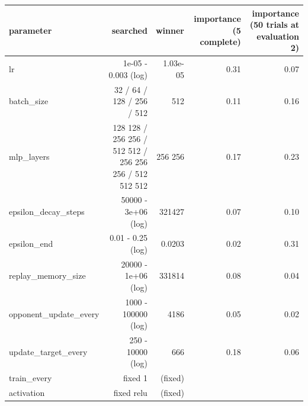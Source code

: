 \begin{tabular}{lrrrr}
\toprule
parameter & searched & winner & importance (5 complete) & importance (50 trials at evaluation 2) \\
\midrule
lr & 1e-05 - 0.003 (log) & 1.03e-05 & 0.31 & 0.07 \\
batch\_size & 32 / 64 / 128 / 256 / 512 & 512 & 0.11 & 0.16 \\
mlp\_layers & 128 128 / 256 256 / 512 512 / 256 256 256 / 512 512 512 & 256 256 & 0.17 & 0.23 \\
epsilon\_decay\_steps & 50000 - 3e+06 (log) & 321427 & 0.07 & 0.10 \\
epsilon\_end & 0.01 - 0.25 (log) & 0.0203 & 0.02 & 0.31 \\
replay\_memory\_size & 20000 - 1e+06 (log) & 331814 & 0.08 & 0.04 \\
opponent\_update\_every & 1000 - 100000 (log) & 4186 & 0.05 & 0.02 \\
update\_target\_every & 250 - 10000 (log) & 666 & 0.18 & 0.06 \\
train\_every & fixed 1 & (fixed) &  &  \\
activation & fixed relu & (fixed) &  &  \\
\bottomrule
\end{tabular}
